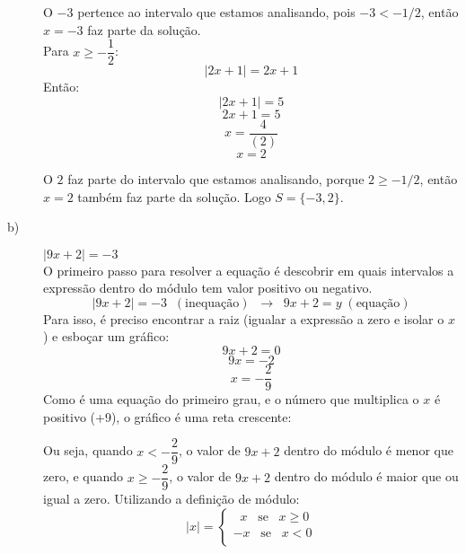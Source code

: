 \begin{description}
                O $-3$ pertence ao intervalo que estamos analisando, pois $-3 < -1/2$, então $x = -3$ faz parte da solução.\\
                
                Para $ x \ge -\dfrac{1}{2}$:
                \[
                |2x+1|= 2x+1
                \]
                Então:
                \[ |2x+1|= 5 \]
                \[2x+1=5 \]
                \[x=\dfrac{4}{(2)}\]
                \[x=2\] 

                O $2$ faz parte do intervalo que estamos analisando, porque $2 \ge -1/2$, então $x=2$ também faz parte da solução. Logo $S = \{-3,2\}$.
		    \item[b)] $|9x+2|=-3$\\
                O primeiro passo para resolver a equação é descobrir em quais intervalos a expressão dentro do módulo tem valor positivo ou negativo.
                \[
                |9x+2|=-3\;\;(\text{inequação}) \;\;     \longrightarrow  \;\; 9x+2=y\;(\text{equação})
                \]
                Para isso, é preciso encontrar a raiz (igualar a expressão a zero e isolar o $x$) e esboçar um gráfico:
                \[ 9x+2=0 \]
                \[ 9x=-2 \]
                \[ x= -\dfrac{2}{9} \]
                Como é uma equação do primeiro grau, e o número que multiplica o $x$ é positivo (+9), o gráfico é uma reta crescente:
                \begin{center}
                \end{center}

                Ou seja, quando $x < -\dfrac{2}{9}$, o valor de $9x + 2$ dentro do módulo é menor que zero, e quando $x \ge -\dfrac{2}{9}$, o valor de $9x+2$ dentro do módulo é maior que ou igual a zero. Utilizando a definição de módulo:\\
                \[ 
	        |x| = \left\{  
	           \begin{array}{c}
		          \;\; x \;\;\; \text{se} \;\;\; x \ge 0\\
		          -x \;\;\; \text{se} \;\;\; x < 0\\
	           \end{array} 
	           \right.
	        \]
         

\end{description}

